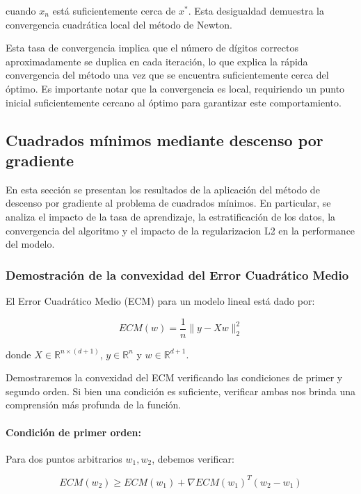 \documentclass{tp02}
\begin{document}
cuando $x_n$ está suficientemente cerca de $x^*$. Esta desigualdad demuestra la 
convergencia cuadrática local del método de Newton.

Esta tasa de convergencia implica que el número de dígitos correctos 
aproximadamente se duplica en cada iteración, lo que explica la rápida 
convergencia del método una vez que se encuentra suficientemente cerca del óptimo.
Es importante notar que la convergencia es local, requiriendo un punto inicial 
suficientemente cercano al óptimo para garantizar este comportamiento.


\subsection{Cuadrados mínimos mediante descenso por gradiente}


En esta sección se presentan los resultados de la aplicación del método de
descenso por gradiente al problema de cuadrados mínimos. En particular, se
analiza el impacto de la tasa de aprendizaje, la estratificación de los datos,
la convergencia del algoritmo y el impacto de la regularizacion L2 en la
performance del modelo.

\subsubsection{Demostración de la convexidad del Error Cuadrático Medio}

El Error Cuadrático Medio (ECM) para un modelo lineal está dado por:

\begin{equation}
ECM(w) = \frac{1}{n}\|y - Xw\|^2_2
\end{equation}

donde $X \in \mathbb{R}^{n\times(d+1)}$, $y \in \mathbb{R}^n$ y 
$w \in \mathbb{R}^{d+1}$.

Demostraremos la convexidad del ECM verificando las condiciones de primer y 
segundo orden. Si bien una condición es suficiente, verificar ambas nos 
brinda una comprensión más profunda de la función.

\paragraph{Condición de primer orden:}
Para dos puntos arbitrarios $w_1, w_2$, debemos verificar:

\begin{equation}
ECM(w_2) \geq ECM(w_1) + \nabla ECM(w_1)^T(w_2 - w_1)
\end{equation}
\end{document}
